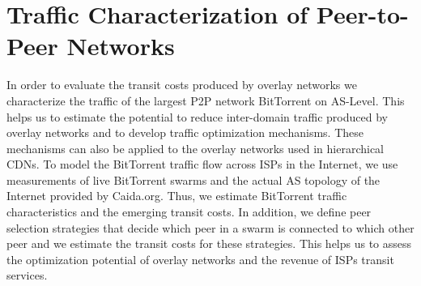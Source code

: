 \section{Traffic Characterization of Peer-to-Peer Networks}\label{sec:aslevel:p2p}

In order to evaluate the transit costs produced by overlay networks we characterize the traffic of the largest P2P network BitTorrent on AS-Level.
This helps us to estimate the potential to reduce inter-domain traffic produced by overlay networks and to develop traffic optimization mechanisms.
These mechanisms can also be applied to the overlay networks used in hierarchical CDNs.
To model the BitTorrent traffic flow across ISPs in the Internet, we use measurements of live BitTorrent swarms and the actual AS topology of the Internet provided by Caida.org. Thus, we estimate BitTorrent traffic characteristics and the emerging transit costs.
In addition, we define peer selection strategies that decide which peer in a swarm is connected to which other peer and we estimate the transit costs for these strategies.
This helps us to assess the optimization potential of overlay networks and the revenue of ISPs transit services.

